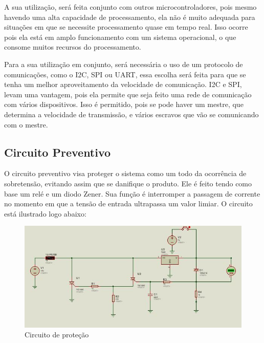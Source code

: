 A sua utilização, será feita conjunto com outros microcontroladores, pois mesmo
havendo uma alta capacidade de processamento, ela não é muito adequada para
situações em que se necessite processamento quase em tempo real. Isso ocorre pois ela
está em amplo funcionamento com um sistema operacional, o que consome muitos
recursos do processamento.

Para a sua utilização em conjunto, será necessária o uso de um protocolo de
comunicações, como o I2C, SPI ou UART, essa escolha será feita para que se tenha um
melhor aproveitamento da velocidade de comunicação. I2C e SPI, levam uma
vantagem, pois ela permite que seja feito uma rede de comunicação com vários
dispositivos. Isso é permitido, pois se pode haver um mestre, que determina a
velocidade de transmissão, e vários escravos que vão se comunicando com o mestre.
\subsection{Circuito Preventivo}
O circuito preventivo visa proteger o sistema como um todo da ocorrência de sobretensão, evitando assim que se danifique o produto. Ele é feito tendo como base um relé e um diodo Zener. Sua função é interromper a passagem de corrente no momento em que a tensão de entrada ultrapassa um valor limiar. O circuito está ilustrado logo abaixo:
 \begin{figure}[H]
 	\begin{center}
 		\includegraphics[scale = 0.75]{figuras/Protecao.JPG}
 		\caption{Circuito de proteção}
 	\end{center}
 \end{figure}

